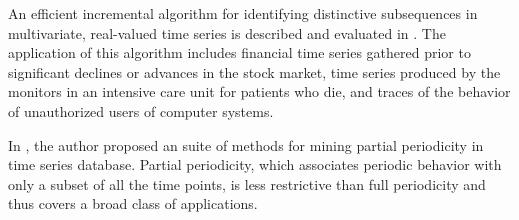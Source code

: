 An efficient incremental algorithm for identifying distinctive subsequences in multivariate, real-valued time series is described and evaluated in \cite{Oates:1999:IDS:312129.312268}.
The application of this algorithm includes financial time series gathered prior to significant declines or advances in the stock market, time series produced by the monitors in
an intensive care unit for patients who die, and traces of the behavior of unauthorized users of computer systems.

In \cite{754913}, the author proposed an suite of methods for mining partial periodicity in time series database. Partial periodicity, which associates periodic
behavior with only a subset of all the time points, is less restrictive than full periodicity and thus covers a broad class of applications.
